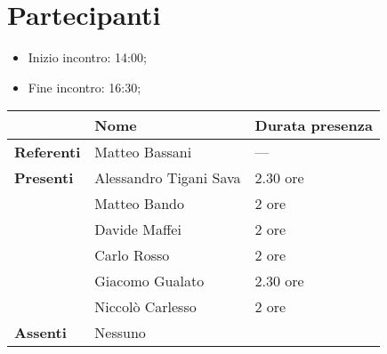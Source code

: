 \section{Partecipanti}

\begin{itemize}
    \item Inizio incontro: 14:00;
    \item Fine incontro: 16:30;
\end{itemize}


\begin{center}
{\renewcommand{\arraystretch}{1.5}
\begin{tabular}{l|ll}
	                    & \textbf{Nome}  & \textbf{Durata presenza} 	\\
	\hline
	\textbf{Referenti} & Matteo Bassani & ---\\
	
	\hline
	\textbf{Presenti}   & Alessandro Tigani Sava            & 2.30 ore     
	\\  & Matteo Bando           & 2 ore     
	\\  & Davide Maffei          & 2 ore     
	\\  & Carlo Rosso            & 2 ore     
	\\  & Giacomo Gualato        & 2.30 ore    
	\\  & Niccolò Carlesso       & 2 ore     \\
	\hline
	\textbf{Assenti}	& 	     Nessuno    &	        \\
\end{tabular}	
}
\end{center}